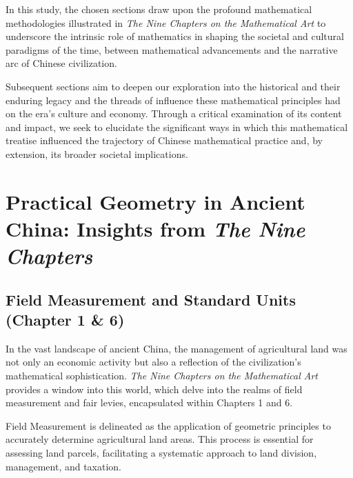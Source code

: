 \documentclass[10pt]{article}
\begin{document}
\vspace{7pt}

In this study, the chosen sections draw upon the profound mathematical methodologies illustrated in \textit{The Nine Chapters on the Mathematical Art} \autocite{Kangshen_Crossley} to underscore the intrinsic role of mathematics in shaping the societal and cultural paradigms of the time, between mathematical advancements and the narrative arc of Chinese civilization.

\vspace{7pt}

Subsequent sections aim to deepen our exploration into the historical and their enduring legacy and the threads of influence these mathematical principles had on the era's culture and economy. Through a critical examination of its content and impact, we seek to elucidate the significant ways in which this mathematical treatise influenced the trajectory of Chinese mathematical practice and, by extension, its broader societal implications.

\vspace{10pt}

\section{Practical Geometry in Ancient China: Insights from \textit{The Nine Chapters}}

\vspace{7pt}

\subsection{Field Measurement and Standard Units (Chapter 1 \& 6)}

In the vast landscape of ancient China, the management of agricultural land was not only an economic activity but also a reflection of the civilization's mathematical sophistication. \textit{The Nine Chapters on the Mathematical Art} provides a window into this world, which delve into the realms of field measurement and fair levies, encapsulated within Chapters 1 and 6.

\vspace{7pt}

Field Measurement is delineated as the application of geometric principles to accurately determine agricultural land areas. This process is essential for assessing land parcels, facilitating a systematic approach to land division, management, and taxation.
\end{document}
